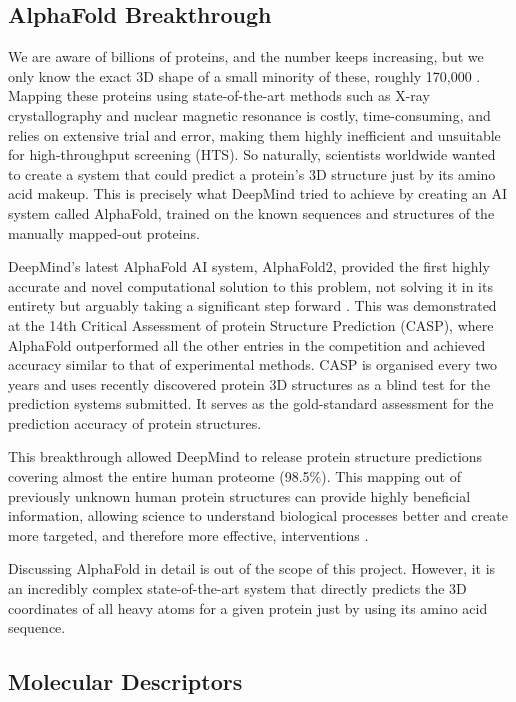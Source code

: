 \subsection{AlphaFold Breakthrough}

We are aware of billions of proteins, and the number keeps increasing, but we only know the exact 3D shape of a small minority of these, roughly 170,000 \citep{Jumper2021}. Mapping these proteins using state-of-the-art methods such as X-ray crystallography and nuclear magnetic resonance is costly, time-consuming, and relies on extensive trial and error, making them highly inefficient and unsuitable for high-throughput screening (HTS). So naturally, scientists worldwide wanted to create a system that could predict a protein's 3D structure just by its amino acid makeup. This is precisely what DeepMind tried to achieve by creating an AI system called AlphaFold, trained on the known sequences and structures of the manually mapped-out proteins.

DeepMind's latest AlphaFold AI system, AlphaFold2, provided the first highly accurate and novel computational solution to this problem, not solving it in its entirety but arguably taking a significant step forward \citep{Jumper2021}. This was demonstrated at the 14th Critical Assessment of protein Structure Prediction (CASP), where AlphaFold outperformed all the other entries in the competition and achieved accuracy similar to that of experimental methods. CASP is organised every two years and uses recently discovered protein 3D structures as a blind test for the prediction systems submitted. It serves as the gold-standard assessment for the prediction accuracy of protein structures.

This breakthrough allowed DeepMind to release protein structure predictions covering almost the entire human proteome (98.5\%). This mapping out of previously unknown human protein structures can provide highly beneficial information, allowing science to understand biological processes better and create more targeted, and therefore more effective, interventions \citep{Tunyasuvunakool2021}. 

Discussing AlphaFold in detail is out of the scope of this project. However, it is an incredibly complex state-of-the-art system that directly predicts the 3D coordinates of all heavy atoms for a given protein just by using its amino acid sequence. 

\subsection{Molecular Descriptors}

